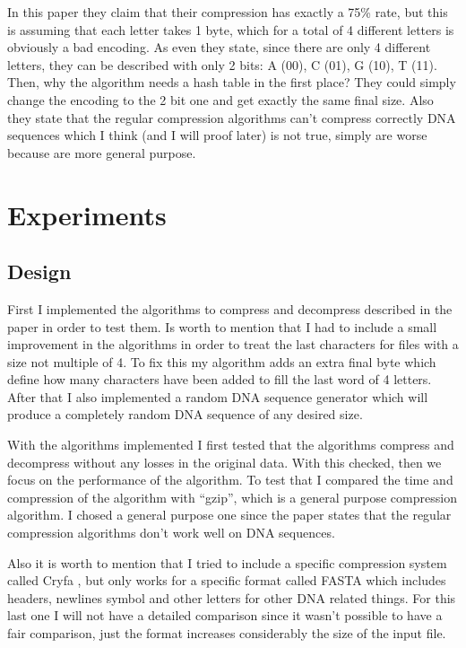 \documentclass[conference,a4paper]{IEEEtran}
\begin{document}
In this paper they claim that their compression has exactly a 75\% rate, but this is assuming that each letter takes 1 byte, which for a total of 4 different letters is obviously a bad encoding. As even they state, since there are only 4 different letters, they can be described with only 2 bits: A (00), C (01), G (10), T (11). Then, why the algorithm needs a hash table in the first place? They could simply change the encoding to the 2 bit one and get exactly the same final size. Also they state that the regular compression algorithms can't compress correctly DNA sequences which I think (and I will proof later) is not true, simply are worse because are more general purpose.

\section{Experiments}
\subsection{Design}
First I implemented the algorithms to compress and decompress described in the paper in order to test them. Is worth to mention that I had to include a small improvement in the algorithms in order to treat the last characters for files with a size not multiple of 4. To fix this my algorithm adds an extra final byte which define how many characters have been added to fill the last word of 4 letters. After that I also implemented a random DNA sequence generator which will produce a completely random DNA sequence of any desired size.

With the algorithms implemented I first tested that the algorithms compress and decompress without any losses in the original data. With this checked, then we focus on the performance of the algorithm. To test that I compared the time and compression of the algorithm with ``gzip'', which is a general purpose compression algorithm. I chosed a general purpose one since the paper states that the regular compression algorithms don't work well on DNA sequences.

Also it is worth to mention that I tried to include a specific compression system called Cryfa \cite{cryfa}, but only works for a specific format called FASTA which includes headers, newlines symbol and other letters for other DNA related things. For this last one I will not have a detailed comparison since it wasn't possible to have a fair comparison, just the format increases considerably the size of the input file.
\end{document}

